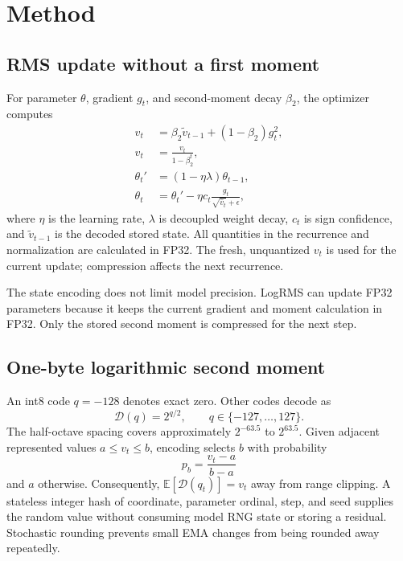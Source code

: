 \documentclass[10pt,twocolumn]{article}
\begin{document}
\section{Method}

\subsection{RMS update without a first moment}

For parameter $\theta$, gradient $g_t$, and second-moment decay $\beta_2$, the
optimizer computes
\begin{align}
v_t &= \beta_2 \widetilde v_{t-1} + (1-\beta_2)g_t^2, \\
\widehat v_t &= \frac{v_t}{1-\beta_2^t}, \\
\theta_t' &= (1-\eta\lambda)\theta_{t-1}, \\
\theta_t &= \theta_t' - \eta c_t
\frac{g_t}{\sqrt{\widehat v_t}+\epsilon},
\end{align}
where $\eta$ is the learning rate, $\lambda$ is decoupled weight decay,
$c_t$ is sign confidence, and $\widetilde v_{t-1}$ is the decoded stored state.
All quantities in the recurrence and normalization are calculated in FP32. The
fresh, unquantized $v_t$ is used for the current update; compression affects the
next recurrence.

The state encoding does not limit model precision. LogRMS can update FP32
parameters because it keeps the current gradient and moment calculation in FP32.
Only the stored second moment is compressed for the next step.

\subsection{One-byte logarithmic second moment}

An int8 code $q=-128$ denotes exact zero. Other codes decode as
\begin{equation}
\mathcal D(q) = 2^{q/2}, \qquad q\in\{-127,\ldots,127\}.
\end{equation}
The half-octave spacing covers approximately $2^{-63.5}$ to $2^{63.5}$.
Given adjacent represented values $a\leq v_t\leq b$, encoding selects $b$ with
probability
\begin{equation}
p_b = \frac{v_t-a}{b-a}
\end{equation}
and $a$ otherwise. Consequently, $\mathbb E[\mathcal D(q_t)]=v_t$ away from
range clipping. A stateless integer hash of coordinate, parameter ordinal,
step, and seed supplies the random value without consuming model RNG state or
storing a residual. Stochastic rounding prevents small EMA changes from being
rounded away repeatedly.
\end{document}
